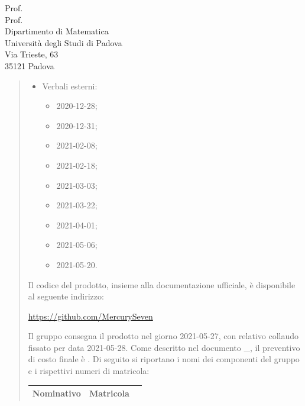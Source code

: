 \documentclass[a4paper,12pt]{letteracdp}
\begin{document}
\begin{letter}{
	Prof. \Tullio{} \\
	Prof. \Riccardo{} \\
	Dipartimento di Matematica \\
	Università degli Studi di Padova \\
	Via Trieste, 63 \\
	35121 Padova}
\begin{quotation}
\begin{itemize}
\begin{itemize}
			\item \docVI{}2021-02-01;
			\item \docVI{}2021-02-20;
			\item \docVI{}2021-03-18;
			\item \docVI{}2021-03-28;
			\item \docVI{}2021-04-16;
			\item \docVI{}2021-05-04;
			\item \docVI{}2021-05-21.
		\end{itemize}
		\item Verbali esterni:
		\begin{itemize}
			\item \docVE{}2020-12-28;
			\item \docVE{}2020-12-31;
			\item \docVE{}2021-02-08;
			\item \docVE{}2021-02-18;
			\item \docVE{}2021-03-03;
			\item \docVE{}2021-03-22;
			\item \docVE{}2021-04-01;
			\item \docVE{}2021-05-06;
			\item \docVE{}2021-05-20.
		\end{itemize}
\thispagestyle{empty}		
	\end{itemize}
Il codice del prodotto, insieme alla documentazione ufficiale, è disponibile al seguente indirizzo:\newline{}
\centerline{\url{https://github.com/MercurySeven}}\newline{}
Il gruppo consegna il prodotto nel giorno 2021-05-27, con relativo collaudo fissato per  data 2021-05-28.\newline{}
Come descritto nel documento \docPdP{}\_\versPdP{}, il preventivo di costo finale è \textbf{}. \newline{}
Di seguito si riportano i nomi dei componenti del gruppo e i rispettivi numeri di matricola:
	
	
\renewcommand{\arraystretch}{1}
	\begin{table}
		\begin{center}
			\setlength{\aboverulesep}{0pt}
			\setlength{\belowrulesep}{0pt}
			\setlength{\extrarowheight}{.75ex}
			\begin{tabular}{ c c c }
				\rowcolor{AzzurroGruppo!30} 
				\textbf{Nominativo} & \textbf{Matricola}\\
				\toprule
				

\end{tabular}
\end{center}
\end{table}
\end{quotation}
\end{letter}
\end{document}
